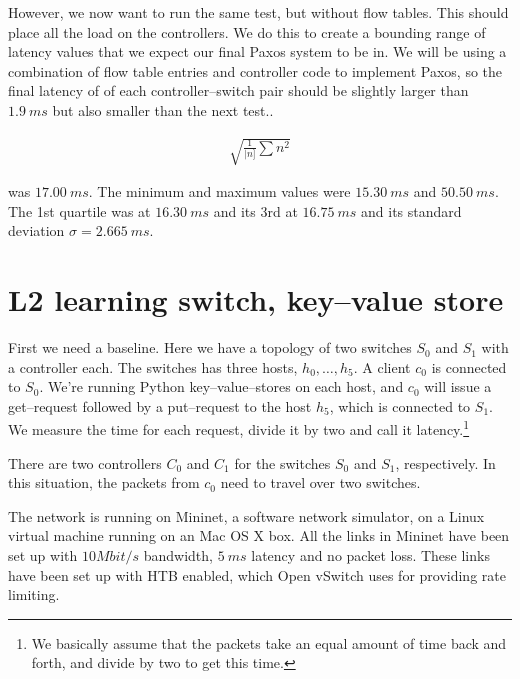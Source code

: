 However, we now want to run the same test, but without flow tables. This
should place all the load on the controllers.  We do this to create a
bounding range of latency values that we expect our final Paxos system to be
in. We will be using a combination of flow table entries and controller code
to implement Paxos, so the final latency of of each controller--switch pair
should be slightly larger than $1.9~ms$ but also smaller than the next
test..

\begin{gather}
  \sqrt{\frac{1}{|n]}\sum{n^2}}
  \label{equation:rms}
\end{gather}

was $17.00~ms$.
The minimum and maximum values were $15.30~ms$ and $50.50~ms$.
The 1st quartile was at $16.30~ms$ and its 3rd at $16.75~ms$ and its standard
deviation $\sigma = 2.665~ms$.


\section{L2 learning switch, key--value store}
\label{chapter:benchmark.l2.kv.noflows}

First we need a baseline.  Here we have a topology of two switches $S_0$ and
$S_1$ with a controller each.  The switches has three hosts, $h_0, \dots, h_5$.
A client $c_0$ is connected to $S_0$. We're running Python
key--value--stores on each host, and $c_0$ will issue a get--request
followed by a put--request to the host $h_5$, which is connected to $S_1$.
We measure the time for each request, divide it
by two and call it latency.\footnote{We basically assume that the packets
take an equal amount of time back and forth, and divide by two to get this
time.}

There are two controllers $C_0$ and $C_1$ for the switches $S_0$ and $S_1$,
respectively.  In this situation, the packets from $c_0$ need to travel
over two switches.

The network is running on Mininet, a software network simulator, on a Linux
virtual machine running on an Mac OS X box.  All the links in Mininet have
been set up with $10 Mbit/s$ bandwidth, $5~ms$ latency and no packet
loss.  These links have been set up with \ac{HTB}
\cite{devera2002hierarchical} enabled, which Open vSwitch
 uses for providing rate limiting.

